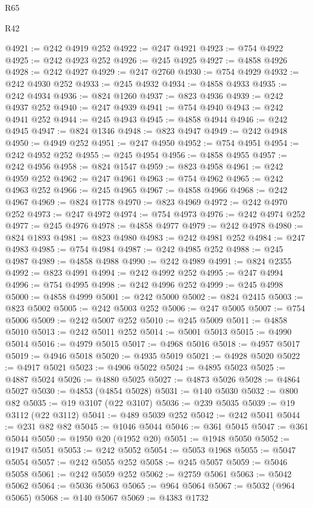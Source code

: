 \begin{lexlean}{R65}
\begin{lexlean}{R42}
\begin{coremodule}
{{{{{{{{{{{{{{{{{{{{{{{{{{{{{{{{{{{{{{{{{{{{{{{{{{{{{{{{{{{{{{{{{{{{{{{{{{{{{{{{{{{{{{{{{{{{{{{{{{{{{{{{{{{{{{{{{{{{{{{{{{{{{{{{{{{{{{{{{{{{{{{{{{{{{{{{{{{{{{{{{{{{{{{{{{{{{{{{{{{{{{{{@4921 := @242 @4919 @252
@4922 := @247 @4921
@4923 := @754 @4922
@4925 := @242 @4923 @252
@4926 := @245 @4925
@4927 := @4858 @4926
@4928 := @242 @4927
@4929 := @247 @2760
@4930 := @754 @4929
@4932 := @242 @4930 @252
@4933 := @245 @4932
@4934 := @4858 @4933
@4935 := @242 @4934
@4936 := @824 @1260
@4937 := @823 @4936
@4939 := @242 @4937 @252
@4940 := @247 @4939
@4941 := @754 @4940
@4943 := @242 @4941 @252
@4944 := @245 @4943
@4945 := @4858 @4944
@4946 := @242 @4945
@4947 := @824 @1346
@4948 := @823 @4947
@4949 := @242 @4948
@4950 := @4949 @252
@4951 := @247 @4950
@4952 := @754 @4951
@4954 := @242 @4952 @252
@4955 := @245 @4954
@4956 := @4858 @4955
@4957 := @242 @4956
@4958 := @824 @1547
@4959 := @823 @4958
@4961 := @242 @4959 @252
@4962 := @247 @4961
@4963 := @754 @4962
@4965 := @242 @4963 @252
@4966 := @245 @4965
@4967 := @4858 @4966
@4968 := @242 @4967
@4969 := @824 @1778
@4970 := @823 @4969
@4972 := @242 @4970 @252
@4973 := @247 @4972
@4974 := @754 @4973
@4976 := @242 @4974 @252
@4977 := @245 @4976
@4978 := @4858 @4977
@4979 := @242 @4978
@4980 := @824 @1893
@4981 := @823 @4980
@4983 := @242 @4981 @252
@4984 := @247 @4983
@4985 := @754 @4984
@4987 := @242 @4985 @252
@4988 := @245 @4987
@4989 := @4858 @4988
@4990 := @242 @4989
@4991 := @824 @2355
@4992 := @823 @4991
@4994 := @242 @4992 @252
@4995 := @247 @4994
@4996 := @754 @4995
@4998 := @242 @4996 @252
@4999 := @245 @4998
@5000 := @4858 @4999
@5001 := @242 @5000
@5002 := @824 @2415
@5003 := @823 @5002
@5005 := @242 @5003 @252
@5006 := @247 @5005
@5007 := @754 @5006
@5009 := @242 @5007 @252
@5010 := @245 @5009
@5011 := @4858 @5010
@5013 := @242 @5011 @252
@5014 := @5001 @5013
@5015 := @4990 @5014
@5016 := @4979 @5015
@5017 := @4968 @5016
@5018 := @4957 @5017
@5019 := @4946 @5018
@5020 := @4935 @5019
@5021 := @4928 @5020
@5022 := @4917 @5021
@5023 := @4906 @5022
@5024 := @4895 @5023
@5025 := @4887 @5024
@5026 := @4880 @5025
@5027 := @4873 @5026
@5028 := @4864 @5027
@5030 := @4853 (@4854 @5028)
@5031 := @140 @5030
@5032 := @800 @82
@5035 := @19 @3107 (@22 @3107)
@5036 := @239 @5035
@5039 := @19 @3112 (@22 @3112)
@5041 := @489 @5039 @252
@5042 := @242 @5041
@5044 := @231 @82 @82
@5045 := @1046 @5044
@5046 := @361 @5045
@5047 := @361 @5044
@5050 := @1950 @20 (@1952 @20)
@5051 := @1948 @5050
@5052 := @1947 @5051
@5053 := @242 @5052
@5054 := @5053 @1968
@5055 := @5047 @5054
@5057 := @242 @5055 @252
@5058 := @245 @5057
@5059 := @5046 @5058
@5061 := @242 @5059 @252
@5062 := @2759 @5061
@5063 := @5042 @5062
@5064 := @5036 @5063
@5065 := @964 @5064
@5067 := @5032 (@964 @5065)
@5068 := @140 @5067
@5069 := @4383 @1732
}}}}}}}}}}}}}}}}}}}}}}}}}}}}}}}}}}}}}}}}}}}}}}}}}}}}}}}}}}}}}}}}}}}}}}}}}}}}}}}}}}}}}}}}}}}}}}}}}}}}}}}}}}}}}}}}}}}}}}}}}}}}}}}}}}}}}}}}}}}}}}}}}}}}}}}}}}}}}}}}}}}}}}}}}}}}}}}}}}}}}}}}
\end{coremodule}
\end{lexlean}
\end{lexlean}
